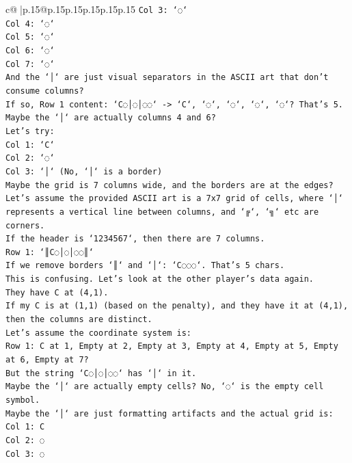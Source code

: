 \documentclass{article}
\begin{document}
{\begin{supertabular}{c@{$\;$}|p{.15\linewidth}@{}p{.15\linewidth}p{.15\linewidth}p{.15\linewidth}p{.15\linewidth}p{.15\linewidth}}
{{{\texttt{Col 3: `◌`} \\
\texttt{Col 4: `◌`} \\
\texttt{Col 5: `◌`} \\
\texttt{Col 6: `◌`} \\
\texttt{Col 7: `◌`} \\
\texttt{And the `│` are just visual separators in the ASCII art that don't consume columns?} \\
\texttt{If so, Row 1 content: `C◌│◌│◌◌` {-}> `C`, `◌`, `◌`, `◌`, `◌`? That's 5.} \\
\texttt{Maybe the `│` are actually columns 4 and 6?} \\
\texttt{Let's try:} \\
\texttt{Col 1: `C`} \\
\texttt{Col 2: `◌`} \\
\texttt{Col 3: `│` (No, `│` is a border)} \\
\texttt{Maybe the grid is 7 columns wide, and the borders are at the edges?} \\
\texttt{Let's assume the provided ASCII art is a 7x7 grid of cells, where `│` represents a vertical line between columns, and `╔`, `╗` etc are corners.} \\
\texttt{If the header is `1234567`, then there are 7 columns.} \\
\texttt{Row 1: `║C◌│◌│◌◌║`} \\
\texttt{If we remove borders `║` and `│`: `C◌◌◌`. That's 5 chars.} \\
\texttt{This is confusing. Let's look at the other player's data again.} \\
\texttt{They have C at (4,1).} \\
\texttt{If my C is at (1,1) (based on the penalty), and they have it at (4,1), then the columns are distinct.} \\
\texttt{Let's assume the coordinate system is:} \\
\texttt{Row 1: C at 1, Empty at 2, Empty at 3, Empty at 4, Empty at 5, Empty at 6, Empty at 7?} \\
\texttt{But the string `C◌│◌│◌◌` has `│` in it.} \\
\texttt{Maybe the `│` are actually empty cells? No, `◌` is the empty cell symbol.} \\
\texttt{Maybe the `│` are just formatting artifacts and the actual grid is:} \\
\texttt{Col 1: C} \\
\texttt{Col 2: ◌} \\
\texttt{Col 3: ◌} \\
}}}
\end{supertabular}}
\end{document}

